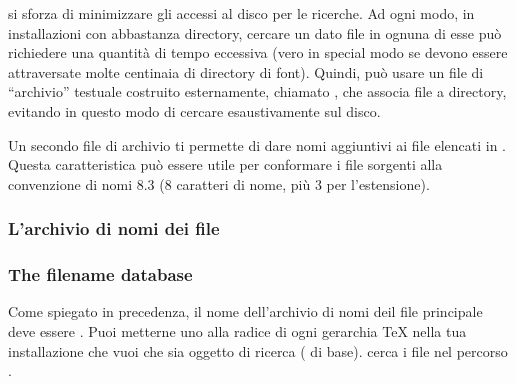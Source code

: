 \documentclass{article}
\begin{document}
\KPS{} si sforza di minimizzare gli accessi al disco per le ricerche. Ad
ogni modo, in installazioni con abbastanza directory, cercare un dato file
in ognuna di esse può richiedere una quantità di tempo eccessiva (vero in
special modo se devono essere attraversate molte centinaia di directory di
font). Quindi, \KPS{} può usare un file di ``archivio'' testuale costruito
esternamente, chiamato , che associa file a directory, evitando
in questo modo di cercare esaustivamente sul disco.

Un secondo file di archivio  ti permette di dare nomi
aggiuntivi ai file elencati in . Questa caratteristica può
essere utile per conformare i file sorgenti alla convenzione 
di nomi 8.3 (8 caratteri di nome, più 3 per l'estensione).

\subsubsection{L'archivio di nomi dei file}
\subsubsection{The filename database}
\label{sec:ls-R}

Come spiegato in precedenza, il nome dell'archivio di nomi deil file
principale deve essere . Puoi metterne uno alla radice di ogni
gerarchia \TeX{} nella tua installazione che vuoi che sia oggetto di
ricerca ( di base). \KPS{} cerca i file  nel
percorso .
\end{document}
